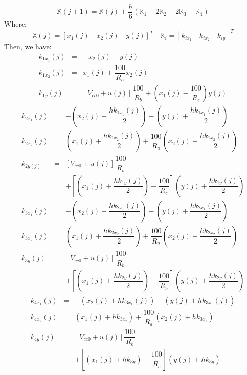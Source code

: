     \begin{equation}
        \mathds{X}\left(j+1\right) = \mathds{X}(j) + \dfrac{h}{6}\left(\mathds{K}_1 + 2\mathds{K}_2 + 2\mathds{K}_3 + \mathds{K}_4\right)
    \end{equation}
    Where: \[\mathds{X}(j)=\left[x_1(j)\quad x_2(j)\quad y(j)\right]^T\quad\mathds{K}_i=\left[k_{ix_1}\quad k_{ix_2}\quad k_{iy}\right]^T\]
    Then, we have:
    \setlength{\arraycolsep}{0.0em}
    \begin{eqnarray}
    k_{1x_1}(j)&=& -x_2(j) - y(j)\nonumber\\
    k_{1x_2}(j)&=& x_1(j) + \dfrac{100}{R_a}x_2(j)\nonumber\\
    k_{1y}(j)&=& [V_{cc0}+u(j)]\dfrac{100}{R_b} + \left(x_1(j) - \dfrac{100}{R_c}\right)y(j)\nonumber
    \end{eqnarray}
    \begin{eqnarray}
    k_{2x_1}(j)&=&-\left(x_2(j) + \dfrac{hk_{1x_1}(j)}{2}\right) - \left(y(j) + \dfrac{hk_{1x_1}(j)}{2}\right)\nonumber\\
    k_{2x_2}(j)&=& \left(x_1(j) + \dfrac{hk_{1x_2}(j)}{2}\right) + \dfrac{100}{R_a}\left(x_2(j) + \dfrac{hk_{1x_2}(j)}{2}\right)\nonumber\\
    k_{2y(j)}&=&[V_{cc0}+u(j)]\dfrac{100}{R_b}\nonumber\\
    &&+ \left[\left(x_1(j) + \dfrac{hk_{1y}(j)}{2}\right) - \dfrac{100}{R_c}\right]\left(y(j) + \dfrac{hk_{1y}(j)}{2}\right)\nonumber
    \end{eqnarray}
    \begin{eqnarray}
    k_{3x_1}(j)&=&-\left(x_2(j) + \dfrac{hk_{2x_1}(j)}{2}\right) - \left(y(j) + \dfrac{hk_{2x_1}(j)}{2}\right)\nonumber\\
    k_{3x_2}(j)&=& \left(x_1(j) + \dfrac{hk_{2x_2}(j)}{2}\right) + \dfrac{100}{R_a}\left(x_2(j) + \dfrac{hk_{2x_2}(j)}{2}\right)\nonumber\\
    k_{3y}(j)&=&[V_{cc0}+u(j)]\dfrac{100}{R_b} \nonumber\\
    &&+ \left[\left(x_1(j) + \dfrac{hk_{2y}(j)}{2}\right) - \dfrac{100}{R_c}\right]\left(y(j) + \dfrac{hk_{2y}(j)}{2}\right)\nonumber
    \end{eqnarray}
    \begin{eqnarray}
    k_{4x_1}(j)&=&-\left(x_2(j) + hk_{3x_1}(j)\right) - \left(y(j) + hk_{3x_1}(j)\right)\nonumber\\
    k_{4x_2}(j)&=&\left(x_1(j) + hk_{3x_2}\right) + \dfrac{100}{R_a}\left(x_2(j) + hk_{3x_2}\right)\nonumber\\
    k_{4y}(j)&=&[V_{cc0}+u(j)]\dfrac{100}{R_b} \nonumber\\
    &&+ \left[\left(x_1(j) + hk_{3y}\right) - \dfrac{100}{R_c}\right]\left(y(j) + hk_{3y}\right)\nonumber
\end{eqnarray}
\setlength{\arraycolsep}{5pt}
